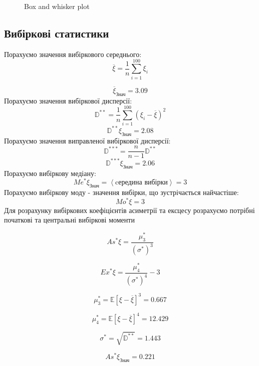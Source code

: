 \documentclass{article}
\begin{document}
\begin{figure}[H]
    \centering
    \caption{Box and whisker plot}
    
\end{figure}
\newpage
\subsection{Вибіркові статистики}
Порахуємо значення вибіркового середнього:
$$\overline{\xi}=\frac{1}{n}\sum_{i=1}^{100} \xi_i$$

$$\overline{\xi}_{\textrm{Знач}}  = 3.09$$
Порахуємо значення вибіркової дисперсії:
$$\mathbb{D}^{**}=\frac{1}{n} \sum_{i=1}^{100} (\xi_i - \overline{\xi})^2$$
$$\mathbb{D}^{**}\xi_{\textrm{Знач}} = 2.08$$
Порахуємо значення виправленої вибіркової дисперсії:
$$\mathbb{D}^{***}=\frac{n}{n-1}\mathbb{D}^{**}$$
$$\mathbb{D}^{***}\xi_{\textrm{Знач}} = 2.06$$
Порахуємо вибіркову медіану:
$$Me^*\xi_{\textrm{Знач}}= \left<\text{cередина вибірки}\right> = 3$$
Порахуємо вибіркову моду - значення вибірки, що зустрічається найчастіше: 
$$Mo^*\xi = 3$$
Для розрахунку вибіркових коефіцієнтів асиметрії та ексцесу розрахуємо потрібні початкові та
центральні вибіркові моменти

$$As^* \xi = \frac{\mu_3^*}{({\sigma^*})^3}$$

$$Ex^* \xi = \frac{\mu_4^*}{({\sigma^*})^4} - 3$$

$$\mu_3^* = \mathbb{E}\left[ \xi - \overline{\xi}\right]^3 = 0.667$$

$$\mu_4^* = \mathbb{E}\left[ \xi - \overline{\xi}\right]^4 = 12.429$$

$$\sigma^* = \sqrt{\mathbb{D}^{**}} = 1.443$$

$$As^*\xi_{\textrm{Знач}} = 0.221$$
\end{document}
